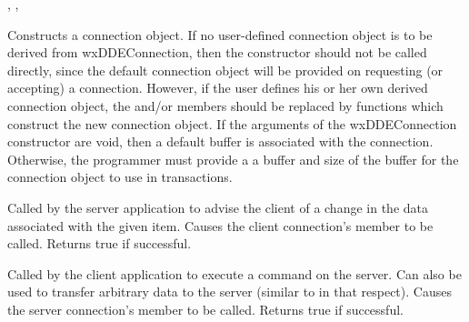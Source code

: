 , , 


\label{wxddeconnectionctor}



Constructs a connection object. If no user-defined connection object is
to be derived from wxDDEConnection, then the constructor should not be
called directly, since the default connection object will be provided on
requesting (or accepting) a connection. However, if the user defines his
or her own derived connection object, the \rtfsp
and/or  members should be replaced by
functions which construct the new connection object. If the arguments of
the wxDDEConnection constructor are void, then a default buffer is
associated with the connection. Otherwise, the programmer must provide a
a buffer and size of the buffer for the connection object to use in
transactions.

\label{wxddeconnectionadvise}


Called by the server application to advise the client of a change in
the data associated with the given item. Causes the client
connection's 
member to be called. Returns true if successful.

\label{wxddeconnectionexecute}


Called by the client application to execute a command on the server. Can
also be used to transfer arbitrary data to the server (similar
to  in that respect). Causes the
server connection's  member to be
called. Returns true if successful.

